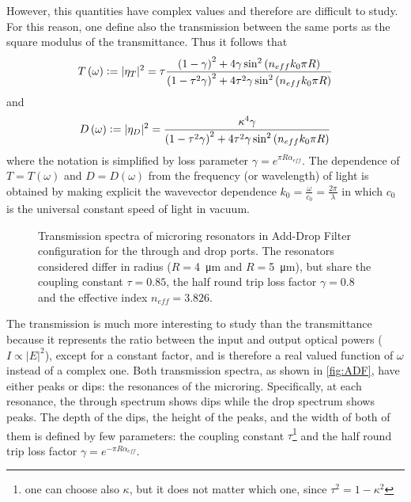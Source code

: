 However, this quantities have complex values and therefore are difficult to study.
For this reason, one define also the transmission between the same ports as the square modulus of the transmittance.
Thus it follows that
\begin{equation}
T \left( \omega \right) \vcentcolon= |\eta_T|^2 = \tau 
\dfrac	{ \left( 1- 				\gamma \right)^2 + 4 				\gamma \sin^2 \left( n_{eff} k_0 \pi R \right) }
			{ \left( 1-\tau^2	\gamma \right)^2 + 4 \tau^2	\gamma \sin^2 \left( n_{eff} k_0 \pi R \right) }
\end{equation}
and
\begin{equation}
D \left( \omega \right) \vcentcolon= |\eta_D|^2 =
\dfrac	{ \kappa^4 \gamma}
			{ \left( 1-\tau^2	\gamma \right)^2 + 4 \tau^2	\gamma \sin^2 \left( n_{eff} k_0 \pi R \right) }
\end{equation}
where the notation is simplified by loss parameter $\gamma = e^{\pi R\alpha_{eff}}$.
The dependence of $T=T(\omega)$ and $D=D(\omega)$ from the frequency (or wavelength) of light is obtained by making explicit the wavevector dependence $k_0=\frac{\omega}{c_0}=\frac{2\pi}{\lambda}$ in which $c_0$ is the universal constant speed of light in vacuum.

\begin{figure}[!htbp]
	\centering
	
	\caption{
		Transmission spectra of microring resonators in Add-Drop Filter configuration for the through and drop ports.
		The resonators considered differ in radius ($R=$\SI{4}{\um} and $R=$\SI{5}{\um}), but share the coupling constant $\tau=0.85$, the half round trip loss factor $\gamma=0.8$ and the effective index $n_{eff}=3.826$.
	}
	\label{fig:ADF}
\end{figure}

The transmission is much more interesting to study than the transmittance because it represents the ratio between the input and output optical powers ($I\propto |E|^2$), except for a constant factor, and is therefore a real valued function of $\omega$ instead of a complex one.
Both transmission spectra, as shown in \autoref{fig:ADF}, have either peaks or dips: the resonances of the microring.
Specifically, at each resonance, the through spectrum shows dips while the drop spectrum shows peaks.
The depth of the dips, the height of the peaks, and the width of both of them is defined by few parameters: the coupling constant $\tau$\footnote{one can choose also $\kappa$, but it does not matter which one, since $\tau^2 = 1-\kappa^2$} and the half round trip loss factor $\gamma = e^{-\pi R\alpha_{eff}}$.

